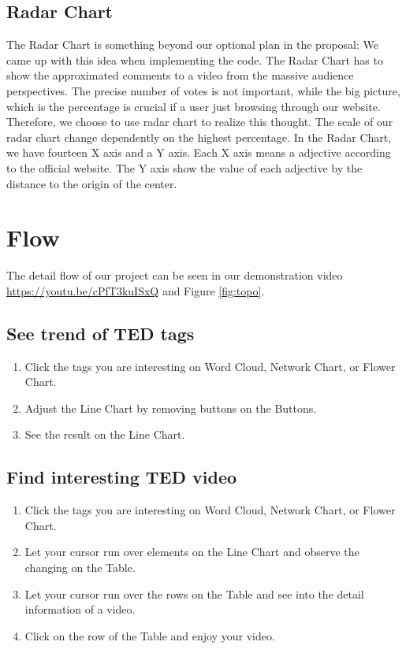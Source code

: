\documentclass{report}
\numberwithin{figure}{section}
\begin{document}
\subsection{Radar Chart}
\quad The Radar Chart is something beyond our optional plan in the proposal: We came up with this idea when implementing the code. The Radar Chart has to show the approximated comments to a video from the massive audience perspectives. The precise number of votes is not important, while the big picture, which is the percentage is crucial if a user just browsing through our website. Therefore, we choose to use radar chart to realize this thought. The scale of our radar chart change dependently on the highest percentage.
 In the Radar Chart, we have fourteen X axis and a Y axis. Each X axis means a adjective according to the official website. The Y axis show the value of each adjective by the distance to the origin of the center.

\section{Flow}

\quad The detail flow of our project can be seen in our demonstration video \url{https://youtu.be/cPfT3kuISxQ} and Figure \ref{fig:topo}.

\subsection{See trend of TED tags}
\begin{enumerate}
\item Click the tags you are interesting on Word Cloud, Network Chart, or Flower Chart.
\item Adjust the Line Chart by removing buttons on the Buttons.
\item See the result on the Line Chart.
\end{enumerate}

\subsection{Find interesting TED video}
\begin{enumerate}
\item Click the tags you are interesting on Word Cloud, Network Chart, or Flower Chart.
\item Let your cursor run over elements on the Line Chart and observe the changing on the Table.
\item Let your cursor run over the rows on the Table and see into the detail information of a video.
\item Click on the row of the Table and enjoy your video.
\end{enumerate}
\end{document}
